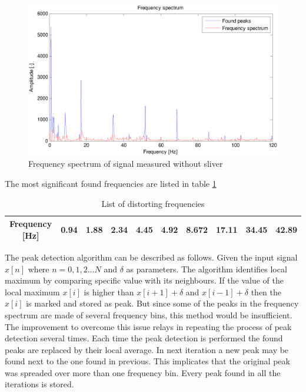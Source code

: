 \documentclass[twoside]{ctuthesis}
\theoremstyle{plain}
\theoremstyle{definition}
\theoremstyle{note}
\begin{document}
\begin{figure}[h]
	\centering
	\includegraphics[width=1.0\textwidth]{withoutMat_foundPeaks_half.eps}
	\caption{Frequency spectrum of signal measured without sliver}
	\label{fig:withoutMat_foundPeaks}
\end{figure}

The most significant found frequencies are listed in table     \ref{tab:DistortinFreq}%
\begin{table}[htbp]
	\centering
	\caption{List of distorting frequencies}
	\begin{tabular}{crrrrrrrrr}
		\midrule
		Frequency [Hz]  & 0.94  & 1.88   & 2.34 & 4.45   & 4.92  & 8.672  & 17.11   & 34.45 & 42.89 \\
		
		\bottomrule
	\end{tabular}%
	\label{tab:DistortinFreq}%
\end{table}%

The peak detection algorithm can be described as follows. Given the input signal $x[n]$ where $n=0,1,2\ldots N$ and $\delta$ as parameters. The algorithm identifies local maximum by comparing specific value with its neighbours. If the value of the local maximum $x[i]$ is higher than $x[i+1] + \delta $ and $x[i-1] + \delta$ then the $x[i]$ is marked and stored as peak.
But since some of the peaks in the frequency spectrum are made of several frequency bins, this method would be insufficient. The improvement to overcome this issue relays in repeating the process of peak detection several times. Each time the peak detection is performed the found peaks are replaced by their local average. In next iteration a new peak may be found next to the one found in previous. This implicates that the original peak was spreaded over more than one frequency bin. Every peak found in all the iterations is stored.
\end{document}
